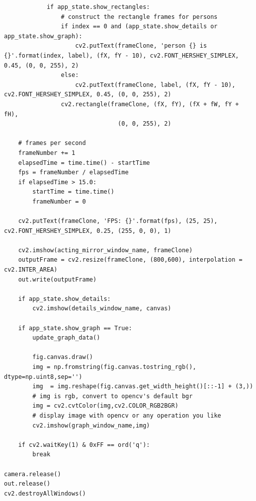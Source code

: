 \documentclass[runningheads,a4paper,11pt]{report}
\begin{document}
\begin{appendices}
\begin{lstlisting}
            if app_state.show_rectangles:
                # construct the rectangle frames for persons
                if index == 0 and (app_state.show_details or app_state.show_graph):
                    cv2.putText(frameClone, 'person {} is {}'.format(index, label), (fX, fY - 10), cv2.FONT_HERSHEY_SIMPLEX, 0.45, (0, 0, 255), 2)
                else:
                    cv2.putText(frameClone, label, (fX, fY - 10), cv2.FONT_HERSHEY_SIMPLEX, 0.45, (0, 0, 255), 2)
                cv2.rectangle(frameClone, (fX, fY), (fX + fW, fY + fH),
                                (0, 0, 255), 2)
                
    # frames per second
    frameNumber += 1
    elapsedTime = time.time() - startTime
    fps = frameNumber / elapsedTime
    if elapsedTime > 15.0:
        startTime = time.time()
        frameNumber = 0
    
    cv2.putText(frameClone, 'FPS: {}'.format(fps), (25, 25), cv2.FONT_HERSHEY_SIMPLEX, 0.25, (255, 0, 0), 1)

    cv2.imshow(acting_mirror_window_name, frameClone)
    outputFrame = cv2.resize(frameClone, (800,600), interpolation = cv2.INTER_AREA)
    out.write(outputFrame)
    
    if app_state.show_details:
        cv2.imshow(details_window_name, canvas)
    
    if app_state.show_graph == True:
        update_graph_data()

        fig.canvas.draw()
        img = np.fromstring(fig.canvas.tostring_rgb(), dtype=np.uint8,sep='')
        img  = img.reshape(fig.canvas.get_width_height()[::-1] + (3,))
        # img is rgb, convert to opencv's default bgr
        img = cv2.cvtColor(img,cv2.COLOR_RGB2BGR)
        # display image with opencv or any operation you like
        cv2.imshow(graph_window_name,img)

    if cv2.waitKey(1) & 0xFF == ord('q'):
        break

camera.release()
out.release()
cv2.destroyAllWindows()
\end{lstlisting}

\end{appendices}
\end{document}
